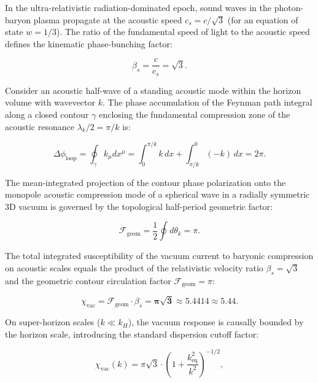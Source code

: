 \documentclass[11pt,a4paper]{article}
\theoremstyle{definition}
\begin{document}
In the ultra-relativistic radiation-dominated epoch, sound waves in the photon-baryon plasma propagate at the acoustic speed $c_s = c/\sqrt{3}$ (for an equation of state $w = 1/3$). The ratio of the fundamental speed of light to the acoustic speed defines the kinematic phase-bunching factor:

\begin{equation}\label{eq:4.48}\tag{4.48}
\beta_s = \frac{c}{c_s} = \sqrt{3}.
\end{equation}

Consider an acoustic half-wave of a standing acoustic mode within the horizon volume with wavevector $k$. The phase accumulation of the Feynman path integral along a closed contour $\gamma$ enclosing the fundamental compression zone of the acoustic resonance $\lambda_k / 2 = \pi / k$ is:

\begin{equation*}
\Delta \phi_{\text{loop}} = \oint_\gamma k_\mu dx^\mu = \int_0^{\pi/k} k \, dx + \int_{\pi/k}^0 (-k) \, dx = 2\pi.
\end{equation*}

The mean-integrated projection of the contour phase polarization onto the monopole acoustic compression mode of a spherical wave in a radially symmetric 3D vacuum is governed by the topological half-period geometric factor:

\begin{equation}\label{eq:4.49}\tag{4.49}
\mathcal{F}_{\text{geom}} = \frac{1}{2} \oint d\theta_k = \pi.
\end{equation}

The total integrated susceptibility of the vacuum current to baryonic compression on acoustic scales equals the product of the relativistic velocity ratio $\beta_s = \sqrt{3}$ and the geometric contour circulation factor $\mathcal{F}_{\text{geom}} = \pi$:

\begin{equation}\label{eq:4.50}\tag{4.50}
\chi_{\text{vac}} = \mathcal{F}_{\text{geom}} \cdot \beta_s = \mathbf{\pi \sqrt{3}} \approx \mathbf{5.4414} \approx \mathbf{5.44}.
\end{equation}

On super-horizon scales ($k \ll k_H$), the vacuum response is causally bounded by the horizon scale, introducing the standard dispersion cutoff factor:

\begin{equation}\label{eq:4.51}\tag{4.51}
\chi_{\text{vac}}(k) = \pi \sqrt{3} \cdot \left( 1 + \frac{k_{\text{eq}}^2}{k^2} \right)^{-1/2},
\end{equation}
\end{document}
